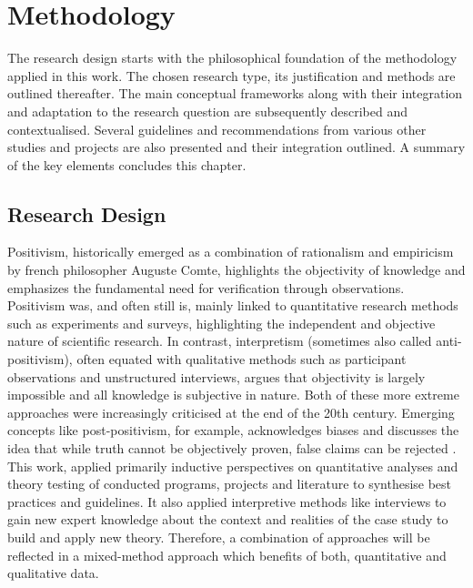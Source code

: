 
\chapter{Methodology} %

\label{chapter3} %

The research design starts with the philosophical foundation of the methodology applied in this work. The chosen research type, its justification and methods are outlined thereafter. The main conceptual frameworks along with their integration and adaptation to the research question are subsequently described and contextualised. Several guidelines and recommendations from various other studies and projects are also presented and their integration outlined. A summary of the key elements concludes this chapter.   

\section{Research Design} %

Positivism, historically emerged as a combination of rationalism and empiricism by french philosopher Auguste Comte, highlights the objectivity of knowledge and emphasizes the fundamental need for verification through observations. Positivism was, and often still is, mainly linked to quantitative research methods such as experiments and surveys, highlighting the independent and objective nature of scientific research. In contrast, interpretism (sometimes also called anti-positivism), often equated with qualitative methods such as participant observations and unstructured interviews, argues that objectivity is largely impossible and all knowledge is subjective in nature. Both of these more extreme approaches were increasingly criticised at the end of the 20th century. Emerging concepts like post-positivism, for example, acknowledges biases and discusses the idea that while truth cannot be objectively proven, false claims can be rejected \autocite{pelzResearchMethodsSocial,trochimResearchMethodsKnowledge2001}.\newline
This work, applied primarily inductive perspectives on quantitative analyses and theory testing of conducted programs, projects and literature to synthesise best practices and guidelines. It also applied interpretive methods like interviews to gain new expert knowledge about the context and realities of the case study to build and apply new theory. Therefore, a combination of approaches will be reflected in a mixed-method approach which benefits of both, quantitative and qualitative data.

